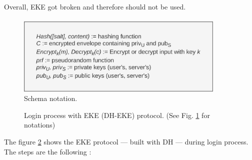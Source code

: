 \documentclass[../report.tex]{subfiles}
\begin{document}
Overall, EKE got broken and therefore should not be used. %



\paragraph{}

\begin{figure}[h]
 \centering
 \includegraphics[width=10cm]{notation.png}
 \caption{Schema notation.}
 \label{fig:notation}
\end{figure}



\begin{figure}[h]
 \centering

 \setlength{\fboxsep}{10pt}
 \setlength{\fboxrule}{1pt}

 \caption{Login process with EKE (DH-EKE) protocol. (See Fig. \ref{fig:notation} for notations)}
 \label{fig:EKE_DH}
\end{figure}

The figure \ref{fig:EKE_DH} shows the EKE protocol --- built with DH ---  during login process.
The steps are the following :
\end{document}
